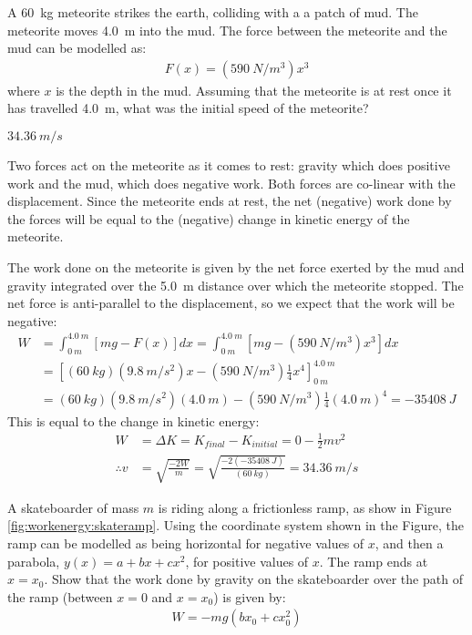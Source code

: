 \question A \SI{60}{kg} meteorite strikes the earth, colliding with a a patch of mud. The meteorite moves \SI{4.0}{m} into the mud. The force between the meteorite and the mud can be modelled as:
\begin{align*}
F(x)=(\SI{590}{N/m^3})x^3
\end{align*}
where $x$ is the depth in the mud. Assuming that the meteorite is at rest once it has travelled \SI{4.0}{m}, what was the initial speed of the meteorite?
\begin{finalanswer}
$\SI{34.36}{m/s}$
\end{finalanswer}
\begin{solution}
Two forces act on the meteorite as it comes to rest: gravity which does positive work and the mud, which does negative work. Both forces are co-linear with the displacement. Since the meteorite ends at rest, the net (negative) work done by the forces  will be equal to the (negative) change in kinetic energy of the meteorite.

The work done on the meteorite is given by the net force exerted by the mud and gravity integrated over the \SI{5.0}{m} distance over which the meteorite stopped. The net force is anti-parallel to the displacement, so we expect that the work will be negative:
\begin{align*}
W&=\int_{\SI{0}{m}}^{\SI{4.0}{m}} [mg -F(x)]dx=\int_{\SI{0}{m}}^{\SI{4.0}{m}} [mg-(\SI{590}{N/m^3})x^3]dx\\
&=\left[(\SI{60}{kg})(\SI{9.8}{m/s^2})x - (\SI{590}{N/m^3})\frac{1}{4} x^4\right]_{\SI{0}{m}}^{\SI{4.0}{m}}\\
&=(\SI{60}{kg})(\SI{9.8}{m/s^2})(\SI{4.0}{m})-(\SI{590}{N/m^3})\frac{1}{4} (\SI{4.0}{m})^4=\SI{-35408}{J}
\end{align*}
This is equal to the change in kinetic energy:
\begin{align*}
W&=\Delta K=K_{final}-K_{initial}=0 - \frac{1}{2}mv^2\\
\therefore v&=\sqrt{\frac{-2W}{m}}=\sqrt{\frac{-2(\SI{-35408}{J})}{(\SI{60}{kg})}}=\SI{34.36}{m/s}
\end{align*}
\end{solution}

\question A skateboarder of mass $m$ is riding along a frictionless ramp, as show in Figure \ref{fig:workenergy:skateramp}. Using the coordinate system shown in the Figure, the ramp can be modelled as being horizontal for negative values of $x$, and then a parabola, $y(x)=a+bx+cx^2$, for positive values of $x$. The ramp ends at $x=x_0$. Show that the work done by gravity on the skateboarder over the path of the ramp (between $x=0$ and $x=x_0$) is given by:
\begin{align*}
W = -mg(bx_0+cx_0^2)
\end{align*}

